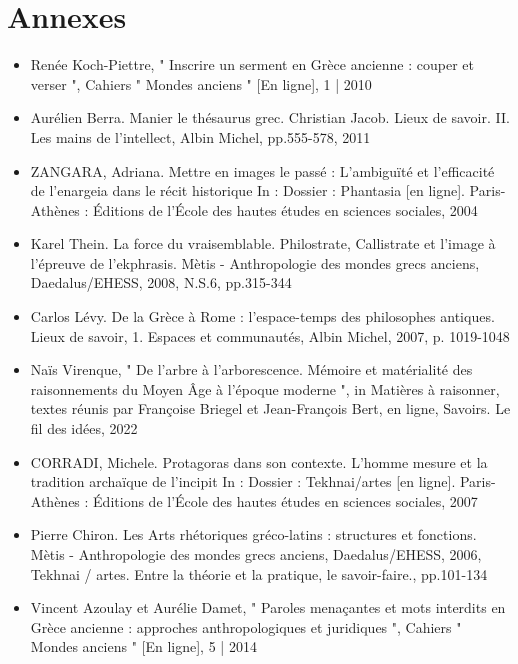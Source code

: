 \documentclass{article}
\begin{document}


\appendix
\part*{Annexes}
\pagestyle{myheadings}

\begin{itemize}
    \item Renée Koch-Piettre, " Inscrire un serment en Grèce ancienne : couper et verser ", Cahiers " Mondes anciens " [En ligne], 1 | 2010
    \item Aurélien Berra. Manier le thésaurus grec. Christian Jacob. Lieux de savoir. II. Les mains de l'intellect, Albin Michel, pp.555-578, 2011
    \item ZANGARA, Adriana. Mettre en images le passé : L’ambiguïté et l’efficacité de l’enargeia dans le récit historique In : Dossier : Phantasia [en ligne]. Paris-Athènes : Éditions de l’École des hautes études en sciences sociales, 2004
    \item Karel Thein. La force du vraisemblable. Philostrate, Callistrate et l’image à l’épreuve de l’ekphrasis. Mètis - Anthropologie des mondes grecs anciens, Daedalus/EHESS, 2008, N.S.6, pp.315-344
    \item Carlos Lévy. De la Grèce à Rome : l'espace-temps des philosophes antiques. Lieux de savoir, 1. Espaces et communautés, Albin Michel, 2007, p. 1019-1048
    \item Naïs Virenque, " De l’arbre à l’arborescence. Mémoire et matérialité des raisonnements du Moyen Âge à l’époque moderne ", in Matières à raisonner, textes réunis par Françoise Briegel et Jean-François Bert, en ligne, Savoirs. Le fil des idées, 2022
    \item CORRADI, Michele. Protagoras dans son contexte. L'homme mesure et la tradition archaïque de l'incipit In : Dossier : Tekhnai/artes [en ligne]. Paris-Athènes : Éditions de l’École des hautes études en sciences sociales, 2007
    \item Pierre Chiron. Les Arts rhétoriques gréco-latins : structures et fonctions. Mètis - Anthropologie des mondes grecs anciens, Daedalus/EHESS, 2006, Tekhnai / artes. Entre la théorie et la pratique, le savoir-faire., pp.101-134
    \item Vincent Azoulay et Aurélie Damet, " Paroles menaçantes et mots interdits en Grèce ancienne : approches anthropologiques et juridiques ", Cahiers " Mondes anciens " [En ligne], 5 | 2014

\end{itemize}
\end{document}
